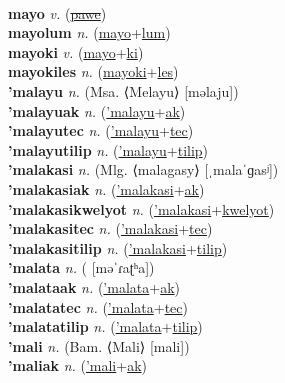  \label{maipaltolum} \\
\textbf{mayo} \textit{v.} (\hyperref[pawe]{\sout{pawe}})
 \label{mayo} \\
\textbf{mayolum} \textit{n.} (\hyperref[mayo]{mayo}+\hyperref[lum]{lum})
 \label{mayolum} \\
\textbf{mayoki} \textit{v.} (\hyperref[mayo]{mayo}+\hyperref[ki]{ki})
 \label{mayoki} \\
\textbf{mayokiles} \textit{n.} (\hyperref[mayoki]{mayoki}+\hyperref[les]{les})
 \label{mayokiles} \\
\textbf{'malayu} \textit{n.} (Msa. ⟨Melayu⟩ [məlaju])
 \label{'malayu} \\
\textbf{'malayuak} \textit{n.} (\hyperref['malayu]{'malayu}+\hyperref[ak]{ak})
 \label{'malayuak} \\
\textbf{'malayutec} \textit{n.} (\hyperref['malayu]{'malayu}+\hyperref[tec]{tec})
 \label{'malayutec} \\
\textbf{'malayutilip} \textit{n.} (\hyperref['malayu]{'malayu}+\hyperref[tilip]{tilip})
 \label{'malayutilip} \\
\textbf{'malakasi} \textit{n.} (Mlg. ⟨malagasy⟩ [ˌmalaˈɡasʲ])
 \label{'malakasi} \\
\textbf{'malakasiak} \textit{n.} (\hyperref['malakasi]{'malakasi}+\hyperref[ak]{ak})
 \label{'malakasiak} \\
\textbf{'malakasikwelyot} \textit{n.} (\hyperref['malakasi]{'malakasi}+\hyperref[kwelyot]{kwelyot})
 \label{'malakasikwelyot} \\
\textbf{'malakasitec} \textit{n.} (\hyperref['malakasi]{'malakasi}+\hyperref[tec]{tec})
 \label{'malakasitec} \\
\textbf{'malakasitilip} \textit{n.} (\hyperref['malakasi]{'malakasi}+\hyperref[tilip]{tilip})
 \label{'malakasitilip} \\
\textbf{'malata} \textit{n.} ( [məˈɾaʈʰa])
 \label{'malata} \\
\textbf{'malataak} \textit{n.} (\hyperref['malata]{'malata}+\hyperref[ak]{ak})
 \label{'malataak} \\
\textbf{'malatatec} \textit{n.} (\hyperref['malata]{'malata}+\hyperref[tec]{tec})
 \label{'malatatec} \\
\textbf{'malatatilip} \textit{n.} (\hyperref['malata]{'malata}+\hyperref[tilip]{tilip})
 \label{'malatatilip} \\
\textbf{'mali} \textit{n.} (Bam. ⟨Mali⟩ [mali])
 \label{'mali} \\
\textbf{'maliak} \textit{n.} (\hyperref['mali]{'mali}+\hyperref[ak]{ak})
